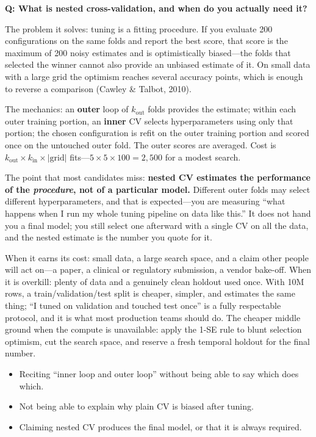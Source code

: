 \begin{interviewq}
\textbf{Q: What is nested cross-validation, and when do you actually need it?}

 \quad {} \quad \badgefreq{\freqmed}

\stronganswer

The problem it solves: tuning is a fitting procedure. If you evaluate 200 configurations on the same folds and report the best score, that score is the maximum of 200 noisy estimates and is optimistically biased---the folds that selected the winner cannot also provide an unbiased estimate of it. On small data with a large grid the optimism reaches several accuracy points, which is enough to reverse a comparison (Cawley \& Talbot, 2010).

The mechanics: an \textbf{outer} loop of $k_{\text{out}}$ folds provides the estimate; within each outer training portion, an \textbf{inner} CV selects hyperparameters using only that portion; the chosen configuration is refit on the outer training portion and scored once on the untouched outer fold. The outer scores are averaged. Cost is $k_{\text{out}} \times k_{\text{in}} \times |\text{grid}|$ fits---$5 \times 5 \times 100 = 2{,}500$ for a modest search.

The point that most candidates miss: \textbf{nested CV estimates the performance of the \emph{procedure}, not of a particular model.} Different outer folds may select different hyperparameters, and that is expected---you are measuring ``what happens when I run my whole tuning pipeline on data like this.'' It does not hand you a final model; you still select one afterward with a single CV on all the data, and the nested estimate is the number you quote for it.

When it earns its cost: small data, a large search space, and a claim other people will act on---a paper, a clinical or regulatory submission, a vendor bake-off. When it is overkill: plenty of data and a genuinely clean holdout used once. With 10M rows, a train/validation/test split is cheaper, simpler, and estimates the same thing; ``I tuned on validation and touched test once'' is a fully respectable protocol, and it is what most production teams should do. The cheaper middle ground when the compute is unavailable: apply the 1-SE rule to blunt selection optimism, cut the search space, and reserve a fresh temporal holdout for the final number.

\redflags
\begin{itemize}
    \item Reciting ``inner loop and outer loop'' without being able to say which does which.
    \item Not being able to explain why plain CV is biased after tuning.
    \item Claiming nested CV produces the final model, or that it is always required.
\end{itemize}


\end{interviewq}
